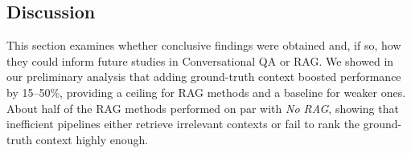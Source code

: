 \documentclass[11pt]{article}
\begin{document}





\subsection{Discussion}\label{ch:6-discussion}%
This section examines whether conclusive findings were obtained and, if so, how they could inform future studies in Conversational QA or RAG.  We showed in our preliminary analysis that adding ground-truth context boosted performance by 15–50\%, providing a ceiling for RAG methods and a baseline for weaker ones. About half of the RAG methods performed on par with \textit{No RAG}, showing that inefficient pipelines either retrieve irrelevant contexts or fail to rank the ground-truth context highly enough.
\end{document}
